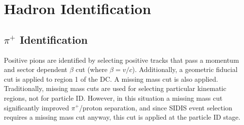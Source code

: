 \chapter{Hadron Identification}
\label{cha:hadronID}
%
\section{$\pi^+$ Identification}
\label{sec:pipID}
Positive pions are identified by selecting positive tracks that pass a momentum and sector dependent $\beta$ cut (where $\beta = v/c$).
Additionally, a geometric fiducial cut is applied to region 1 of the DC.
A missing mass cut is also applied.
Traditionally, missing mass cuts are used for selecting particular kinematic regions, not for particle ID.
However, in this situation a missing mass cut significantly improved $\pi^+$/proton separation, and since SIDIS event selection requires a missing mass cut anyway, this cut is applied at the particle ID stage.
%
